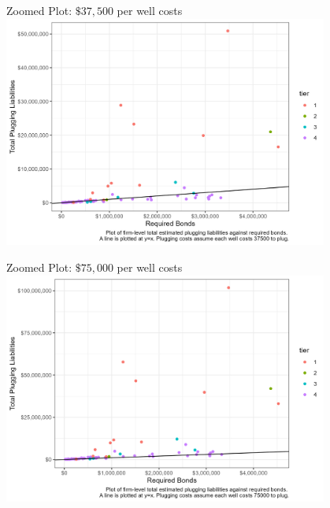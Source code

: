 \documentclass{beamer}
\begin{document}
\begin{frame}{Zoomed Plot: $\$37,500$ per well costs}
\label{Liability1Zoom}
\includegraphics[width=0.8\textwidth]{Figures/BondsLiabilities1_zoomed.jpg}\\
\hyperlink{Fig1}{}
\end{frame}


\begin{frame}{Zoomed Plot: $\$75,000$ per well costs}
\label{Liability2Zoom}
\includegraphics[width=0.8\textwidth]{Figures/BondsLiabilities2_zoomed.jpg}\\
\hyperlink{Fig2}{}
\end{frame}
\end{document}
